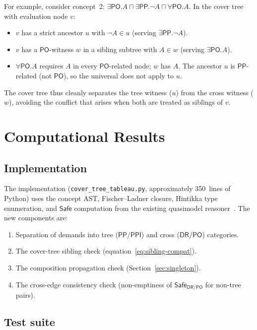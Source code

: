 \documentclass[a4paper,11pt]{article}
\theoremstyle{definition}
\newcommand{\DR}{\ensuremath{\mathsf{DR}}}
\newcommand{\PO}{\ensuremath{\mathsf{PO}}}
\newcommand{\PP}{\ensuremath{\mathsf{PP}}}
\newcommand{\PPI}{\ensuremath{\mathsf{PPI}}}
\newcommand{\Safe}{\ensuremath{\mathsf{Safe}}}
\begin{document}
For example, consider concept~2:
$\exists\PO.A \sqcap \exists\PP.\neg A \sqcap \forall\PO.A$.
In the cover tree with evaluation node $v$:
\begin{itemize}[nosep]
  \item $v$ has a strict ancestor $u$ with $\neg A \in u$
    (serving $\exists\PP.\neg A$).
  \item $v$ has a $\PO$-witness $w$ in a sibling subtree with
    $A \in w$ (serving $\exists\PO.A$).
  \item $\forall\PO.A$ requires $A$ in every $\PO$-related node;
    $w$ has $A$. The ancestor $u$ is $\PP$-related (not $\PO$),
    so the universal does not apply to $u$.
\end{itemize}

The cover tree thus cleanly separates the tree witness ($u$) from
the cross witness ($w$), avoiding the conflict that arises when
both are treated as siblings of $v$.


\section{Computational Results}
\label{sec:results}

\subsection{Implementation}

The implementation (\texttt{cover\_tree\_tableau.py}, approximately
350~lines of Python) uses the concept AST, Fischer--Ladner closure,
Hintikka type enumeration, and $\Safe$ computation from the
existing quasimodel reasoner~\cite{ClaudeDecidability}.
The new components are:
\begin{enumerate}[nosep]
  \item Separation of demands into tree ($\PP/\PPI$) and cross
    ($\DR/\PO$) categories.
  \item The cover-tree sibling check
    (equation~\eqref{eq:sibling-compat}).
  \item The composition propagation check
    (Section~\ref{sec:singleton}).
  \item The cross-edge consistency check
    (non-emptiness of $\Safe_{\DR/\PO}$ for non-tree pairs).
\end{enumerate}

\subsection{Test suite}
\end{document}
